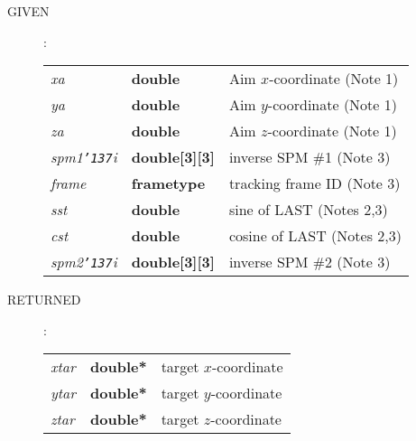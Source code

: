 \documentclass[12pt,fleqn,twoside]{article}
\renewcommand{\_}{{\tt\char'137}}     %
\newcommand{\args}[2]
{
  \goodbreak
  \begin{description}
  \item[#1]: \\[1.5ex] \nopagebreak
    \hspace*{-0.9em}
    \begin{tabular}{p{4.5em}p{5.8em}p{23.5em}}
      #2
    \end{tabular}
  \end{description}
  \vspace{-3ex}
}
\newcommand{\spec}[3]
{
  {\em {#1}} & {\bf \mbox{#2}} & {#3}
}
\begin{document}
\args{GIVEN}
{
\spec{xa}{double}{{\sc Aim} $x$-coordinate (Note 1)} \\
\spec{ya}{double}{{\sc Aim} $y$-coordinate (Note 1)} \\
\spec{za}{double}{{\sc Aim} $z$-coordinate (Note 1)} \\
\spec{spm1\_i}{double[3][3]}{inverse SPM \#1 (Note 3)} \\
\spec{frame}{\sc frametype}{tracking frame ID (Note 3)} \\
\spec{sst}{double}{sine of LAST (Notes 2,3)} \\
\spec{cst}{double}{cosine of LAST (Notes 2,3)} \\
\spec{spm2\_i}{double[3][3]}{inverse SPM \#2 (Note 3)}
}
\args{RETURNED}
{
\spec{xtar}{double*}{target $x$-coordinate} \\
\spec{ytar}{double*}{target $y$-coordinate} \\
\spec{ztar}{double*}{target $z$-coordinate}
}
\end{document}
